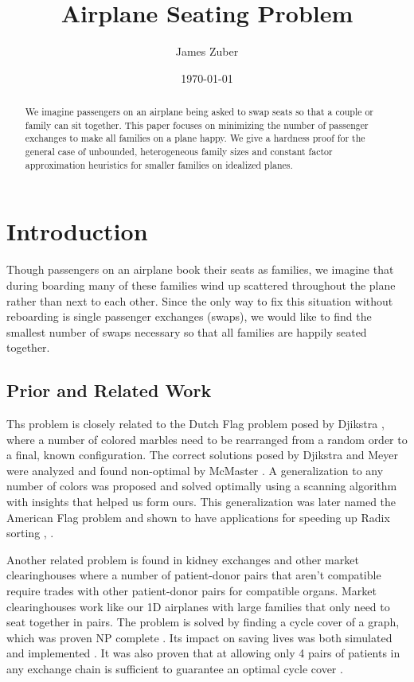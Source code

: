 \documentclass[11pt,twocolumn]{article}
\title{Airplane Seating Problem}
\author{James Zuber}
\date{\today}
\begin{document}
\maketitle

\begin{abstract}
We imagine passengers on an airplane being asked to swap seats so that a couple or family can sit together.  This paper focuses on minimizing the number of passenger exchanges to make all families on a plane happy.  We give a hardness proof for the general case of unbounded, heterogeneous family sizes and constant factor approximation heuristics for smaller families on idealized planes.
\end{abstract}

\section{Introduction}
Though passengers on an airplane book their seats as families, we imagine that during boarding many of these families wind up scattered throughout the plane rather than next to each other.  Since the only way to fix this situation without reboarding is single passenger exchanges (swaps), we would like to find the smallest number of swaps necessary so that all families are happily seated together.

\subsection{Prior and Related Work}

Ths problem is closely related to the Dutch Flag problem posed by Djikstra \cite{dijkstra1976discipline}, where a number of colored marbles need to be rearranged from a random order to a final, known configuration.  The correct solutions posed by Djikstra and Meyer were analyzed and found non-optimal by McMaster \cite{mcMaster1978analysis}.  A generalization to any number of colors was proposed and solved optimally \cite{bitner1982asymptotically} using a scanning algorithm with insights that helped us form ours.  This generalization was later named the American Flag problem and shown to have applications for speeding up Radix sorting \cite{mcllroy1993engineering}, \cite{al2005formulation}.

Another related problem is found in kidney exchanges and other market clearinghouses where a number of patient-donor pairs that aren't compatible require trades with other patient-donor pairs for compatible organs.  Market clearinghouses work like our 1D airplanes with large families that only need to seat together in pairs.  The problem is solved by finding a cycle cover of a graph, which was proven NP complete \cite{abraham2007clearing}.  Its impact on saving lives was both simulated \cite{roth2004kidney} and implemented \cite{abraham2007clearing}.  It was also proven that at allowing only 4 pairs of patients in any exchange chain is sufficient to guarantee an optimal cycle cover \cite{roth2007efficient}.
\end{document}
